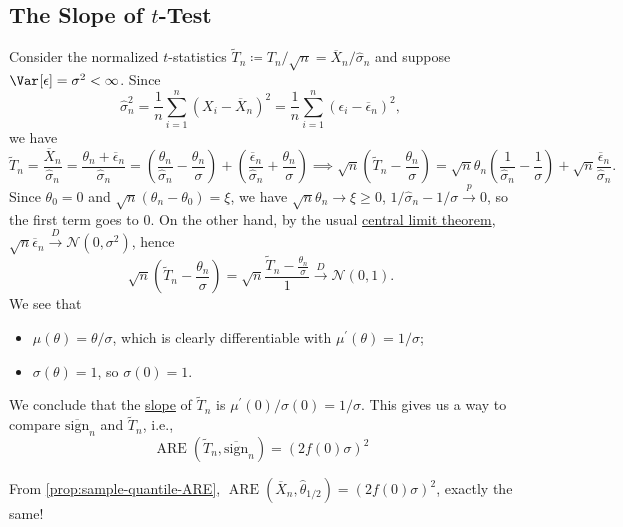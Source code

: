 \subsection{The Slope of \(t\)-Test}
Consider the normalized \(t\)-statistics \(\widetilde{T} _n \coloneqq T_n / \sqrt{n} = \overline{X} _n / \hat{\sigma} _n\) and suppose \(\Var_{}[\epsilon ] = \sigma ^2 < \infty \). Since
\[
	\hat{\sigma} _n^2
	= \frac{1}{n} \sum_{i=1}^{n} (X_i - \overline{X} _n)^2
	= \frac{1}{n} \sum_{i=1}^{n} (\epsilon _i - \overline{\epsilon} _n)^2,
\]
we have
\[
	\widetilde{T} _n
	= \frac{\overline{X} _n}{\hat{\sigma} _n}
	= \frac{\theta _n + \overline{\epsilon} _n}{\hat{\sigma} _n}
	= \left( \frac{\theta _n}{\hat{\sigma} _n} - \frac{\theta _n}{\sigma } \right) + \left( \frac{\overline{\epsilon} _n}{\hat{\sigma} _n} + \frac{\theta _n}{\sigma } \right)
	\implies
	\sqrt{n} \left( \widetilde{T} _n - \frac{\theta _n}{\sigma } \right)
	= \sqrt{n} \theta _n \left( \frac{1}{\hat{\sigma} _n} - \frac{1}{\sigma } \right) + \sqrt{n} \frac{\overline{\epsilon} _n}{\hat{\sigma} _n}.
\]
Since \(\theta _0 = 0\) and \(\sqrt{n} (\theta _n - \theta _0) = \xi \), we have \(\sqrt{n} \theta _n \to \xi \geq 0\), \(1 / \hat{\sigma} _n - 1 / \sigma \overset{p}{\to} 0\), so the first term goes to \(0\). On the other hand, by the usual \hyperref[thm:CLT]{central limit theorem}, \(\sqrt{n} \overline{\epsilon} _n \overset{D}{\to} \mathcal{N} (0, \sigma ^2)\), hence
\[
	\sqrt{n} \left( \widetilde{T} _n - \frac{\theta _n}{\sigma } \right)
	= \sqrt{n} \frac{\widetilde{T} _n - \frac{\theta _n}{\sigma }}{1}
	\overset{D}{\to} \mathcal{N} (0, 1).
\]
We see that
\begin{itemize}
	\item \(\mu (\theta ) = \theta / \sigma \), which is clearly differentiable with \(\mu ^{\prime} (\theta ) = 1 / \sigma \);
	\item \(\sigma (\theta ) = 1\), so \(\sigma (0) = 1\).
\end{itemize}
We conclude that the \hyperref[def:slope]{slope} of \(\widetilde{T} _n\) is \(\mu ^{\prime} (0) / \sigma (0) = 1 / \sigma \). This gives us a way to compare \(\overline{\mathrm{sign} }_n \) and \(\widetilde{T} _n\), i.e.,
\[
	\operatorname{ARE}(\widetilde{T} _n, \overline{\mathrm{sign}} _n)
	= \left( 2 f(0) \sigma \right) ^2
\]

\begin{prev}
	From \autoref{prop:sample-quantile-ARE}, \(\operatorname{ARE}(\overline{X} _n , \hat{\theta} _{1 / 2}) = (2 f(0) \sigma )^2\), exactly the same!
\end{prev}

